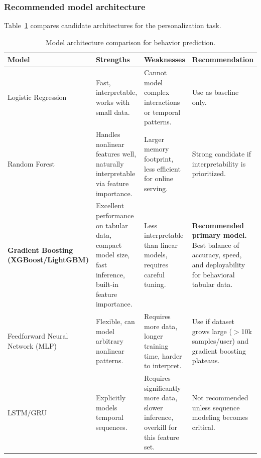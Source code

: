 \subsubsection{Recommended model architecture}

Table~\ref{tab:model-comparison} compares candidate architectures for the
personalization task.

\begin{table}[H]
    \centering
    \caption{Model architecture comparison for behavior prediction.}
    \label{tab:model-comparison}
    \renewcommand{\arraystretch}{1.2}
    \small
    \begin{tabularx}{\textwidth}{@{} >{\raggedright\arraybackslash}p{2.5cm} X X X @{}}
        \toprule
        \textbf{Model} & \textbf{Strengths} & \textbf{Weaknesses} & \textbf{Recommendation} \\
        \midrule
        Logistic Regression &
        Fast, interpretable, works with small data. &
        Cannot model complex interactions or temporal patterns. &
        Use as baseline only. \\
        
        Random Forest &
        Handles nonlinear features well, naturally interpretable via feature importance. &
        Larger memory footprint, less efficient for online serving. &
        Strong candidate if interpretability is prioritized. \\
        
        \textbf{Gradient Boosting (XGBoost/LightGBM)} &
        Excellent performance on tabular data, compact model size, fast inference, built-in feature importance. &
        Less interpretable than linear models, requires careful tuning. &
        \textbf{Recommended primary model.} Best balance of accuracy, speed, and deployability for behavioral tabular data. \\
        
        Feedforward Neural Network (MLP) &
        Flexible, can model arbitrary nonlinear patterns. &
        Requires more data, longer training time, harder to interpret. &
        Use if dataset grows large ($>$10k samples/user) and gradient boosting plateaus. \\
        
        LSTM/GRU &
        Explicitly models temporal sequences. &
        Requires significantly more data, slower inference, overkill for this feature set. &
        Not recommended unless sequence modeling becomes critical. \\
        \bottomrule
    \end{tabularx}
\end{table}

